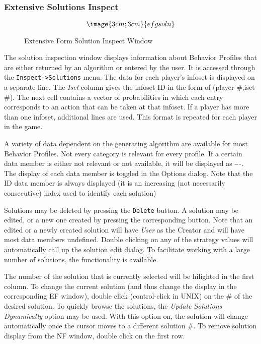 {\subsubsection{Extensive Solutions Inspect}\label{ExtensiveSolutionInspect}
\begin{figure}
$$\image{3cm;3cm}{efgsoln}$$
\caption{Extensive Form Solution Inspect Window}\label{fig_efgsoln}
\end{figure}

The solution inspection window displays information about Behavior Profiles 
that are either returned by an algorithm or entered by the user.  
It is accessed through the {\tt Inspect->Solutions} menu.
The data for each player's infoset is displayed on a separate
line.  The {\em Iset} column gives the infoset ID in the form of (player \#,iset \#).
The next cell contains a vector of probabilities in which each entry corresponds to
an action that can be taken at that infoset.  If a player has more than one infoset,
additional lines are used.  This format is repeated for each player in the game.

A variety of data dependent on the generating algorithm are available for most
 Behavior Profiles. Not every category is relevant for every profile.  If a
certain data member is either not relevant or not available, it will be 
displayed as {\tt ----}.  The display of each data member is toggled in the
Options dialog.  Note that the ID data member is always displayed (it is
an increasing (not necessarily consecutive) index used to identify each
solution)

Solutions may be deleted by pressing the {\tt Delete} button.  A solution may
be edited, or a new one created by pressing the corresponding button.  Note 
that an edited or a newly created solution will have {\em User} as the
Creator and will have most data members undefined.  Double clicking on any
of the strategy values will automatically call up the solution edit dialog.
To facilitate working with a large number of solutions, 
the  functionality is available.

The number of the solution that is currently selected will be hilighted in the first
column.  To change the current solution (and thus change the display in the 
corresponding EF window), double click (control-click in UNIX) on the \# of the
desired solution.  To quickly browse the solutions, the {\em Update Solutions Dynamically}
option may be used.  With this option on, the solution will change automatically once
the cursor moves to a different solution \#.  To remove solution display from the NF window,
double click on the first row.

}
